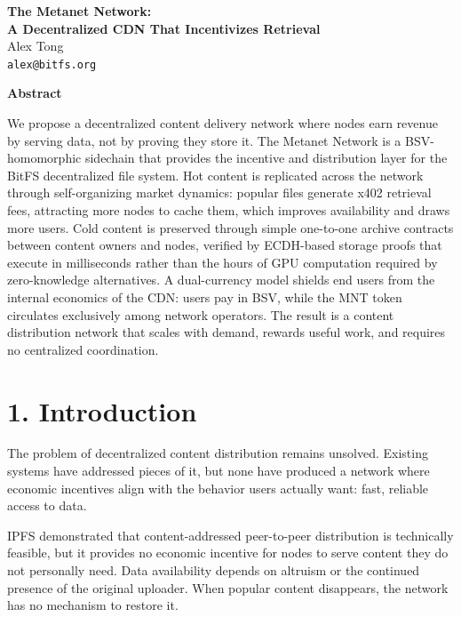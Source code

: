 \documentclass[11pt,a4paper]{article}
\renewenvironment{abstract}{%
  \begin{center}
    \bfseries Abstract
  \end{center}
  \itshape
}{\par\bigskip}
\begin{document}
\begin{center}
  {\LARGE\bfseries The Metanet Network:\\[0.3em]
  A Decentralized CDN That Incentivizes Retrieval}\\[1.5em]
  {\large Alex Tong}\\[0.3em]
  \texttt{alex@bitfs.org}\\[1.5em]
\end{center}

\begin{abstract}
We propose a decentralized content delivery network where nodes earn revenue by serving data, not by proving they store it. The Metanet Network is a BSV-homomorphic sidechain that provides the incentive and distribution layer for the BitFS decentralized file system. Hot content is replicated across the network through self-organizing market dynamics: popular files generate x402 retrieval fees, attracting more nodes to cache them, which improves availability and draws more users. Cold content is preserved through simple one-to-one archive contracts between content owners and nodes, verified by ECDH-based storage proofs that execute in milliseconds rather than the hours of GPU computation required by zero-knowledge alternatives. A dual-currency model shields end users from the internal economics of the CDN: users pay in BSV, while the MNT token circulates exclusively among network operators. The result is a content distribution network that scales with demand, rewards useful work, and requires no centralized coordination.
\end{abstract}

\section{1. Introduction}

The problem of decentralized content distribution remains unsolved. Existing systems have addressed pieces of it, but none have produced a network where economic incentives align with the behavior users actually want: fast, reliable access to data.

IPFS demonstrated that content-addressed peer-to-peer distribution is technically feasible, but it provides no economic incentive for nodes to serve content they do not personally need. Data availability depends on altruism or the continued presence of the original uploader. When popular content disappears, the network has no mechanism to restore it.
\end{document}
